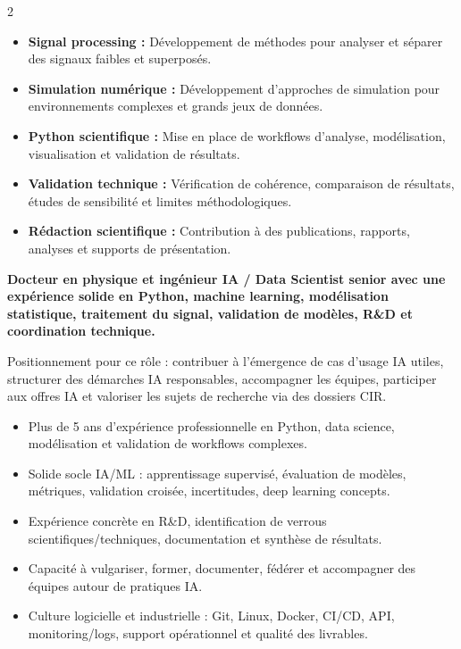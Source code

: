 \documentclass[8pt,a4paper,ragged2e,withhyper]{altacv}
\begin{document}
\begin{paracol}{2}
\begin{itemize}
  \item \textbf{Signal processing :} Développement de méthodes pour analyser et séparer des signaux faibles et superposés.
  \item \textbf{Simulation numérique :} Développement d’approches de simulation pour environnements complexes et grands jeux de données.
  \item \textbf{Python scientifique :} Mise en place de workflows d’analyse, modélisation, visualisation et validation de résultats.
  \item \textbf{Validation technique :} Vérification de cohérence, comparaison de résultats, études de sensibilité et limites méthodologiques.
  \item \textbf{Rédaction scientifique :} Contribution à des publications, rapports, analyses et supports de présentation.
\end{itemize}

\switchcolumn


\textbf{Docteur en physique et ingénieur IA / Data Scientist senior avec une expérience solide en Python, machine learning, modélisation statistique, traitement du signal, validation de modèles, R\&D et coordination technique.}

Positionnement pour ce rôle : contribuer à l’émergence de cas d’usage IA utiles, structurer des démarches IA responsables, accompagner les équipes, participer aux offres IA et valoriser les sujets de recherche via des dossiers CIR.

\begin{itemize}
  \item Plus de 5 ans d’expérience professionnelle en Python, data science, modélisation et validation de workflows complexes.
  \item Solide socle IA/ML : apprentissage supervisé, évaluation de modèles, métriques, validation croisée, incertitudes, deep learning concepts.
  \item Expérience concrète en R\&D, identification de verrous scientifiques/techniques, documentation et synthèse de résultats.
  \item Capacité à vulgariser, former, documenter, fédérer et accompagner des équipes autour de pratiques IA.
  \item Culture logicielle et industrielle : Git, Linux, Docker, CI/CD, API, monitoring/logs, support opérationnel et qualité des livrables.
\end{itemize}


\end{paracol}
\end{document}
